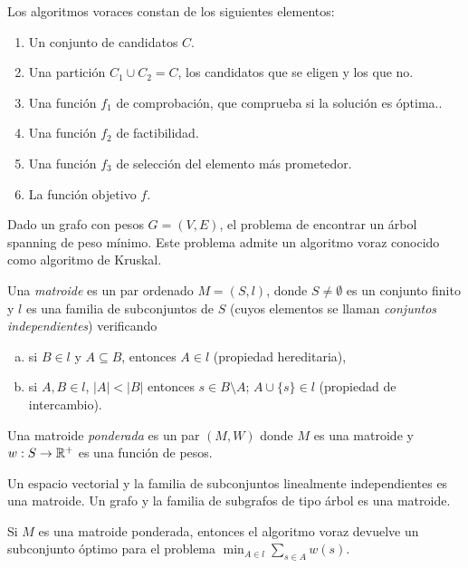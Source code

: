 \documentclass[AL.tex]{subfiles}
\begin{document}
Los algoritmos voraces constan de los siguientes elementos:
\begin{enumerate}
\item Un conjunto de candidatos $C$.
\item
 Una partición $C_1\cup C_2=C$, los candidatos que se eligen y los que no.
 \item  Una función $f_1$ de comprobación, que comprueba si la solución es óptima..
 \item Una función $f_2$ de factibilidad.
 \item Una función $f_3$ de selección del elemento más prometedor.
 \item La función objetivo $f$.
 \end{enumerate}
 
 
\begin{ej}
Dado un grafo con pesos $G=(V,E)$, el problema de encontrar un árbol spanning de peso mínimo. Este problema admite un algoritmo voraz conocido como algoritmo de Kruskal. 
\end{ej}

\begin{defi}
Una \emph{matroide} es un par ordenado $M=(S,l)$, donde $S\neq\emptyset$ es un conjunto finito y $l$ es una familia de subconjuntos de $S$ (cuyos elementos se llaman \emph{conjuntos independientes}) verificando
\begin{enumerate}[a)]
\item si $B\in l$ y $A\subseteq B$, entonces $A\in l$ (propiedad hereditaria),
\item si $A,B\in l$, $|A|<|B|$ entonces $s\in B\setminus A$; $A\cup\{s\}\in l$ (propiedad de intercambio).
\end{enumerate}
Una matroide \emph{ponderada} es un par $(M,W)$ donde $M$ es una matroide y $w:S\to\mathbb{R}^+$ es una función de pesos.
\end{defi}


\begin{ej}
Un espacio vectorial y la familia de subconjuntos linealmente independientes es una matroide. Un grafo y la familia de subgrafos de tipo árbol es una matroide.
\end{ej}

\begin{teorema}
Si $M$ es una matroide ponderada, entonces el algoritmo voraz devuelve un subconjunto óptimo para el problema $\min_{A\in l}\sum_{s\in A}w(s)$. 
\end{teorema}
\end{document}
